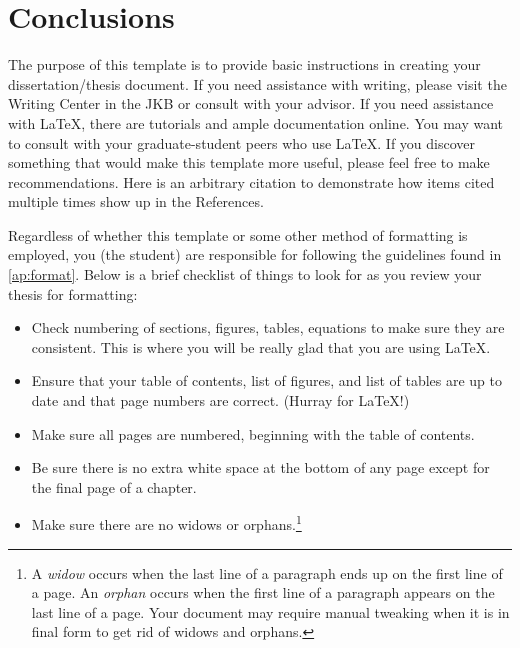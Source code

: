 \chapter{Conclusions}

The purpose of this template is to provide basic instructions in creating your dissertation/thesis document. If you need assistance with writing, please visit the Writing Center in the JKB or consult with your advisor. If you need assistance with \LaTeX, there are tutorials and ample documentation online. You may want to consult with your graduate-student peers who use \LaTeX. If you discover something that would make this template more useful, please feel free to make recommendations. Here is an arbitrary citation to demonstrate how items cited multiple times show up in the References.

Regardless of whether this template or some other method of formatting is employed, you (the student) are responsible for following the guidelines found in \cref{ap:format}. Below is a brief checklist of things to look for as you review your thesis for formatting:
\begin{itemize}
	\item Check numbering of sections, figures, tables, equations to make sure they are consistent.	This is where you will be really glad that you are using \LaTeX.
	\item Ensure that your table of contents, list of figures, and list of tables are up to date and that page numbers are correct. (Hurray for \LaTeX!)
	\item Make sure all pages are numbered, beginning with the table of contents.
	\item Be sure there is no extra white space at the bottom of any page except for the final page of a chapter.
	\item Make sure there are no widows or orphans.\footnote{A \emph{widow} occurs when the last line of a paragraph ends up on the first line of a page. An \emph{orphan} occurs when the first line of a paragraph appears on the last line of a page. Your document may require manual tweaking when it is in final form to get rid of widows and orphans.}
\end{itemize}
